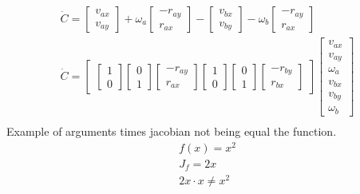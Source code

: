 \documentclass{article}
\begin{document}
\begin{gather}
\dot C = \begin{bmatrix} v_{ax} \\ v_{ay} \end{bmatrix} + \omega_a \begin{bmatrix} -r_{ay} \\ r_{ax} \end{bmatrix} -
\begin{bmatrix} v_{bx} \\ v_{by} \end{bmatrix} - \omega_b \begin{bmatrix} -r_{ay} \\ r_{ax} \end{bmatrix} \\
\dot C =  \begin{bmatrix}  
	\begin{bmatrix} 1 \\ 0  \end{bmatrix}
	\begin{bmatrix} 0 \\ 1 \end{bmatrix}
	\begin{bmatrix} -r_{ay} \\ r_{ax} \end{bmatrix}
	\begin{bmatrix} 1 \\ 0  \end{bmatrix}
	\begin{bmatrix} 0 \\ 1 \end{bmatrix}
	\begin{bmatrix} -r_{by} \\ r_{bx} \end{bmatrix}
\end{bmatrix} 
 \begin{bmatrix} v_{ax} \\ v_{ay} \\ \omega_a \\ v_{bx} \\ v_{by} \\ \omega_b  \end{bmatrix} \\
\end{gather}
Example of arguments times jacobian not being equal the function. \\
\begin{gather}  
f(x) = x^2 \\
J_f = 2x \\ 
2x \cdot x \neq x^2
\end{gather}  
\end{document}
